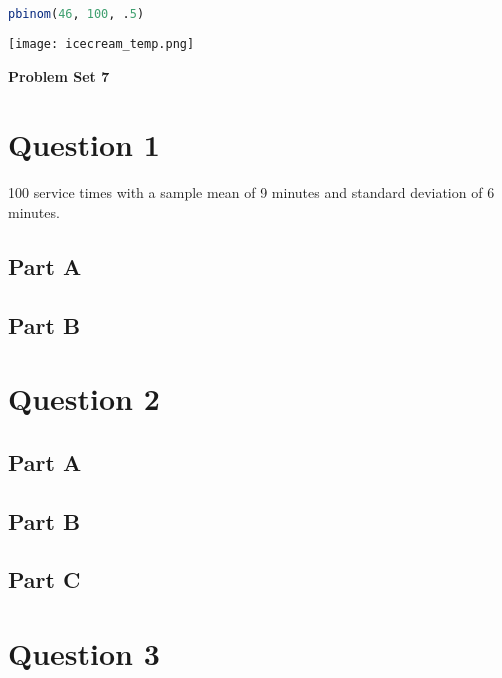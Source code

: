 \documentclass[letterpaper]{article}
\begin{document}
\begin{lstlisting}[language=R]
     pbinom(46, 100, .5)
\end{lstlisting}

\begin{center}
    \texttt{[image: icecream\_temp.png]}
\end{center}

\vspace*{6pt}

\noindent \textbf{\huge{Problem Set 7}}

\bigskip

\section*{Question 1}

100 service times with a sample mean of 9 minutes and standard deviation of 6 minutes.

\subsection*{Part A}



\subsection*{Part B}

\newpage

\section*{Question 2}

\subsection*{Part A}

\subsection*{Part B}

\subsection*{Part C}

\newpage

\section*{Question 3}
\end{document}
